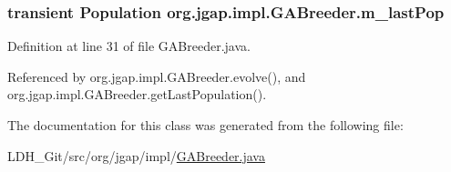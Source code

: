 \hypertarget{classorg_1_1jgap_1_1impl_1_1_g_a_breeder_a73929f7c19c7225866a94822e51e2417}{
\subsubsection[{m\-\_\-last\-Pop}]{\setlength{\rightskip}{0pt plus 5cm}transient {\bf Population} org.\-jgap.\-impl.\-G\-A\-Breeder.\-m\-\_\-last\-Pop\hspace{0.3cm}{\ttfamily [private]}}}\label{classorg_1_1jgap_1_1impl_1_1_g_a_breeder_a73929f7c19c7225866a94822e51e2417}


Definition at line 31 of file G\-A\-Breeder.\-java.



Referenced by org.\-jgap.\-impl.\-G\-A\-Breeder.\-evolve(), and org.\-jgap.\-impl.\-G\-A\-Breeder.\-get\-Last\-Population().



The documentation for this class was generated from the following file\-:\begin{DoxyCompactItemize}
\item 
L\-D\-H\-\_\-\-Git/src/org/jgap/impl/\hyperlink{_g_a_breeder_8java}{G\-A\-Breeder.\-java}\end{DoxyCompactItemize}
